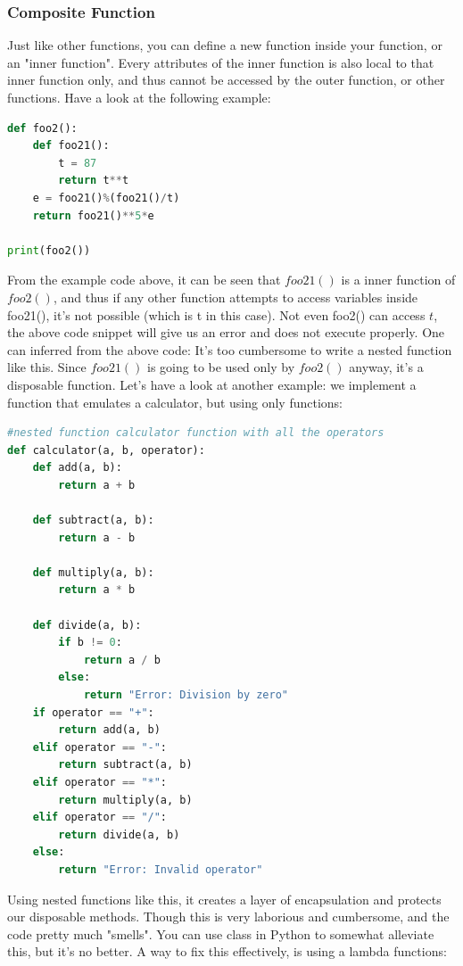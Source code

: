 \documentclass[twoside,final]{hcmut-report}
\begin{document}
\subsubsection{Composite Function}
\hspace*{6.5mm} Just like other functions, you can define a new function inside your function, or an "inner function". Every attributes of the inner function is also local to that inner function only, and thus cannot be accessed by the outer function, or other functions. Have a look at the following example:
\begin{lstlisting}[language=Python, caption=Composite Function]
def foo2():
    def foo21():
        t = 87
        return t**t
    e = foo21()%(foo21()/t)
    return foo21()**5*e

print(foo2())

\end{lstlisting}
\hspace*{6.5mm} From the example code above, it can be seen that $foo21()$ is a inner function of $foo2()$, and thus if any other function attempts to access variables inside foo21(), it's not possible (which is t in this case). Not even foo2() can access $t$, the above code snippet will give us an error and does not execute properly. One can inferred from the above code: It's too cumbersome to write a nested function like this. Since $foo21()$ is going to be used only by $foo2()$ anyway, it's a disposable function. Let's have a look at another example: we implement a function that emulates a calculator, but using only functions: 
\begin{lstlisting}[language=Python, caption=Composite Calculator Implementation]
#nested function calculator function with all the operators
def calculator(a, b, operator):
    def add(a, b):
        return a + b
    
    def subtract(a, b):
        return a - b
    
    def multiply(a, b):
        return a * b

    def divide(a, b):
        if b != 0:
            return a / b
        else:
            return "Error: Division by zero"
    if operator == "+":
        return add(a, b)
    elif operator == "-":
        return subtract(a, b)
    elif operator == "*":
        return multiply(a, b)
    elif operator == "/":
        return divide(a, b)
    else:
        return "Error: Invalid operator"
\end{lstlisting}
\hspace*{6.5mm} Using nested functions like this, it creates a layer of encapsulation and protects our disposable methods. Though this is very laborious and cumbersome, and the code pretty much "smells". You can use class in Python to somewhat alleviate this, but it's no better. A way to fix this effectively, is using a lambda functions:
\end{document}
